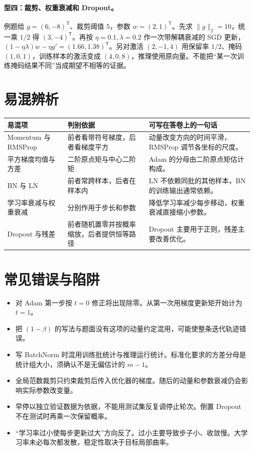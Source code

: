\documentclass[UTF8,a4paper,zihao=-4,fontset=fandol]{ctexrep}
\begin{document}
\paragraph{型四：裁剪、权重衰减和 Dropout。}
例题给 $g=(6,-8)^{\mathsf T}$、裁剪阈值 $5$，参数 $w=(2,1)^{\mathsf T}$。先求 $\|g\|_2=10$，统一乘 $1/2$ 得 $(3,-4)^{\mathsf T}$。再按 $\eta=0.1,\lambda=0.2$ 作一次带解耦衰减的 SGD 更新，$(1-\eta\lambda)w-\eta g'=(1.66,1.38)^{\mathsf T}$。另对激活 $(2,-1,4)$ 用保留率 $1/2$、掩码 $(1,0,1)$，训练样本的激活变成 $(4,0,8)$，推理使用原向量。不能把“某一次训练掩码结果不同”当成期望不相等的证据。

\section{易混辨析}

\begin{center}
\begin{tabularx}{\linewidth}{@{}lXX@{}}
\toprule
易混项 & 判别依据 & 可写在答卷上的一句话\\
\midrule
Momentum 与 RMSProp & 前者看带符号梯度，后者看梯度平方 & 动量改变方向的时间平滑，RMSProp 调节各坐标的尺度。\\
平方梯度均值与方差 & 二阶原点矩与中心二阶矩 & Adam 的分母由二阶原点矩估计构成。\\
BN 与 LN & 前者常跨样本，后者在样本内 & LN 不依赖同批的其他样本，BN 的训练输出通常依赖。\\
学习率衰减与权重衰减 & 分别作用于步长和参数 & 降低学习率减少每步移动，权重衰减直接缩小参数。\\
Dropout 与残差 & 前者随机置零并按概率缩放，后者提供恒等路径 & Dropout 主要用于正则，残差主要改善优化。\\
\bottomrule
\end{tabularx}
\end{center}

\section{常见错误与陷阱}

\begin{itemize}
\item 对 Adam 第一步按 $t=0$ 修正将出现除零。从第一次用梯度更新矩开始计为 $t=1$。
\item 把 $(1-\beta)$ 的写法与题面没有这项的动量约定混用，可能使整条迭代轨迹错误。
\item 写 BatchNorm 时混用训练批统计与推理运行统计。标准化要求的方差分母是统计组大小，须确认不是无偏估计的 $m-1$。
\item 全局范数裁剪只约束裁剪后传入优化器的梯度。随后的动量和参数衰减仍会影响实际参数改变量。
\item 早停以独立验证数据为依据，不能用测试集反复调停止轮次。倒置 Dropout 不在测试时再乘一次保留概率。
\item “学习率过小使每步更新过大”方向反了。过小主要导致步子小、收敛慢。大学习率未必每次都发散，稳定性取决于目标局部曲率。
\end{itemize}
\end{document}
